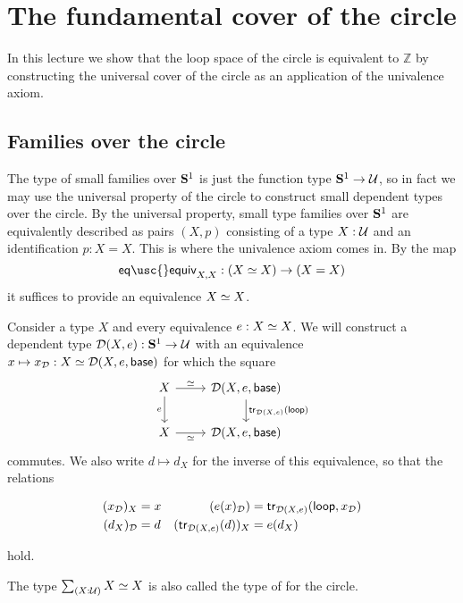 \section{The fundamental cover of the circle}

In this lecture we show that the loop space of the circle is equivalent to $\mathbb{Z}$ by constructing the universal cover of the circle as an application of the univalence axiom. 

\subsection{Families over the circle}

The type of small families over $\mathbf{S}^{1}$ is just the function type $\mathbf{S}^{1}\to\mathcal{U}$, so in fact we may use the universal property of the circle to construct small dependent types over the circle. 
By the universal property, small type families over $\mathbf{S}^{1}$ are equivalently described as pairs $(X,p)$ consisting of a type $X:\mathcal{U}$ and an identification $p:X=X$.
This is where the univalence axiom comes in. By the map
\begin{equation*}
\mathsf{eq\usc{}equiv}_{X,X}:(\eqv{X}{X})\to (X=X)
\end{equation*}
it suffices to provide an equivalence $\eqv{X}{X}$.

\begin{defn}\label{defn:circle_descent}
Consider a type $X$ and every equivalence $e:\eqv{X}{X}$.
We will construct a dependent type $\mathcal{D}(X,e):\mathbf{S}^{1}\to\mathcal{U}$ with an equivalence $x\mapsto x_{\mathcal{D}}:\eqv{X}{\mathcal{D}(X,e,\base)}$ for which the square
\begin{equation*}
\begin{tikzcd}
X \arrow[r,"\eqvsym"] \arrow[d,swap,"e"] & \mathcal{D}(X,e,\base) \arrow[d,"\mathsf{tr}_{\mathcal{D}(X,e)}(\lloop)"] \\
X \arrow[r,swap,"\eqvsym"] & \mathcal{D}(X,e,\base)
\end{tikzcd}
\end{equation*}
commutes. We also write $d\mapsto d_{X}$ for the inverse of this equivalence, so that the relations
\begin{samepage}%
\begin{align*}
(x_{\mathcal{D}})_X & =x & (e(x)_{\mathcal{D}}) & = \mathsf{tr}_{\mathcal{D}(X,e)}(\mathsf{loop},x_{\mathcal{D}}) \\
(d_X)_{\mathcal{D}} & =d & (\mathsf{tr}_{\mathcal{D}(X,e)}(d))_X & = e(d_X)
\end{align*}
\end{samepage}%
hold.

The type $\sm{X:\UU}\eqv{X}{X}$ is also called the type of  for the circle.
\end{defn}

